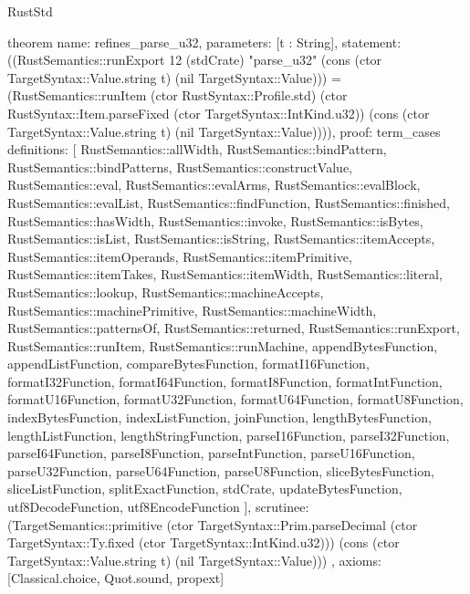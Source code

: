 \begin{lexlean}{RustStd}
\begin{semanticmodule}
theorem{
  name: refines_parse_u32,
  parameters: [t : String],
  statement: ((RustSemantics::runExport 12 (stdCrate) "parse_u32" (cons (ctor TargetSyntax::Value.string t) (nil TargetSyntax::Value))) = (RustSemantics::runItem (ctor RustSyntax::Profile.std) (ctor RustSyntax::Item.parseFixed (ctor TargetSyntax::IntKind.u32)) (cons (ctor TargetSyntax::Value.string t) (nil TargetSyntax::Value)))),
  proof: term_cases{
    definitions: [
      RustSemantics::allWidth,
      RustSemantics::bindPattern,
      RustSemantics::bindPatterns,
      RustSemantics::constructValue,
      RustSemantics::eval,
      RustSemantics::evalArms,
      RustSemantics::evalBlock,
      RustSemantics::evalList,
      RustSemantics::findFunction,
      RustSemantics::finished,
      RustSemantics::hasWidth,
      RustSemantics::invoke,
      RustSemantics::isBytes,
      RustSemantics::isList,
      RustSemantics::isString,
      RustSemantics::itemAccepts,
      RustSemantics::itemOperands,
      RustSemantics::itemPrimitive,
      RustSemantics::itemTakes,
      RustSemantics::itemWidth,
      RustSemantics::literal,
      RustSemantics::lookup,
      RustSemantics::machineAccepts,
      RustSemantics::machinePrimitive,
      RustSemantics::machineWidth,
      RustSemantics::patternsOf,
      RustSemantics::returned,
      RustSemantics::runExport,
      RustSemantics::runItem,
      RustSemantics::runMachine,
      appendBytesFunction,
      appendListFunction,
      compareBytesFunction,
      formatI16Function,
      formatI32Function,
      formatI64Function,
      formatI8Function,
      formatIntFunction,
      formatU16Function,
      formatU32Function,
      formatU64Function,
      formatU8Function,
      indexBytesFunction,
      indexListFunction,
      joinFunction,
      lengthBytesFunction,
      lengthListFunction,
      lengthStringFunction,
      parseI16Function,
      parseI32Function,
      parseI64Function,
      parseI8Function,
      parseIntFunction,
      parseU16Function,
      parseU32Function,
      parseU64Function,
      parseU8Function,
      sliceBytesFunction,
      sliceListFunction,
      splitExactFunction,
      stdCrate,
      updateBytesFunction,
      utf8DecodeFunction,
      utf8EncodeFunction
    ],
    scrutinee: (TargetSemantics::primitive (ctor TargetSyntax::Prim.parseDecimal (ctor TargetSyntax::Ty.fixed (ctor TargetSyntax::IntKind.u32))) (cons (ctor TargetSyntax::Value.string t) (nil TargetSyntax::Value)))
  },
  axioms: [Classical.choice, Quot.sound, propext]
}


\end{semanticmodule}
\end{lexlean}
